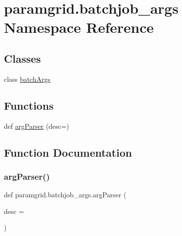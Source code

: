 \hypertarget{namespaceparamgrid_1_1batchjob__args}{}\section{paramgrid.\+batchjob\+\_\+args Namespace Reference}
\label{namespaceparamgrid_1_1batchjob__args}
\subsection*{Classes}
\begin{DoxyCompactItemize}
\item 
class \mbox{\hyperlink{classparamgrid_1_1batchjob__args_1_1batchArgs}{batch\+Args}}
\end{DoxyCompactItemize}
\subsection*{Functions}
\begin{DoxyCompactItemize}
\item 
def \mbox{\hyperlink{namespaceparamgrid_1_1batchjob__args_aceebf38a5c4b37d6a9f813888dde3af4}{arg\+Parser}} (desc=\textquotesingle{}\textquotesingle{})
\end{DoxyCompactItemize}


\subsection{Function Documentation}
\mbox{\label{namespaceparamgrid_1_1batchjob__args_aceebf38a5c4b37d6a9f813888dde3af4}} 
\subsubsection{\texorpdfstring{arg\+Parser()}{argParser()}}
{\footnotesize\ttfamily def paramgrid.\+batchjob\+\_\+args.\+arg\+Parser (\begin{DoxyParamCaption}\item[{}]{desc = {\ttfamily \textquotesingle{}\textquotesingle{}} }\end{DoxyParamCaption})}

